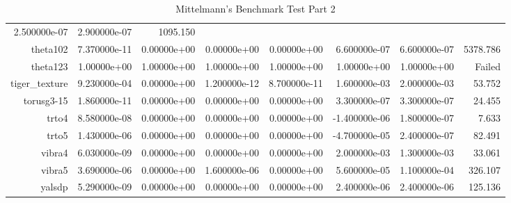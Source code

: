 {{\begin{table}[h]
\begin{center}
{\begin{tabular}{r|r|r|r|r|r|r|r}
      2.500000e-07 & 2.900000e-07 & 1095.150\\
      theta102 & 7.370000e-11 & 0.00000e+00 & 0.00000e+00 & 0.00000e+00 &
      6.600000e-07 & 6.600000e-07 & 5378.786\\
      theta123 & 1.00000e+00 & 1.00000e+00 & 1.00000e+00 & 1.00000e+00 &
      1.00000e+00 & 1.00000e+00 & Failed\\
      tiger\_texture & 9.230000e-04 & 0.00000e+00 & 1.200000e-12 &
      8.700000e-11 & 1.600000e-03 & 2.000000e-03 & 53.752\\
      torusg3-15 & 1.860000e-11 & 0.00000e+00 & 0.00000e+00 & 0.00000e+00 &
      3.300000e-07 & 3.300000e-07 & 24.455\\
      trto4 & 8.580000e-08 & 0.00000e+00 & 0.00000e+00 & 0.00000e+00 &
      -1.400000e-06 & 1.800000e-07 & 7.633\\
      trto5 & 1.430000e-06 & 0.00000e+00 & 0.00000e+00 & 0.00000e+00 &
      -4.700000e-05 & 2.400000e-07 & 82.491\\
      vibra4 & 6.030000e-09 & 0.00000e+00 & 0.00000e+00 & 0.00000e+00 &
      2.000000e-03 & 1.300000e-03 & 33.061\\
      vibra5 & 3.690000e-06 & 0.00000e+00 & 1.600000e-06 & 0.00000e+00 &
      5.600000e-05 & 1.100000e-04 & 326.107\\
      yalsdp & 5.290000e-09 & 0.00000e+00 & 0.00000e+00 & 0.00000e+00 &
      2.400000e-06 & 2.400000e-06 & 125.136\\
      \hline
    \end{tabular}
  }  
\end{center}
  \caption{Mittelmann's Benchmark Test Part 2}
\end{table}}}



